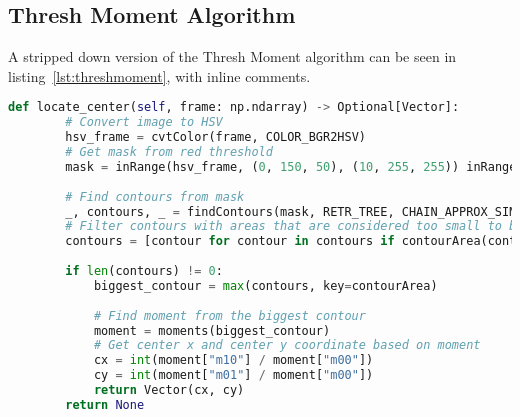\subsection{Thresh Moment Algorithm}\label{solution:thresh_moment}

A stripped down version of the Thresh Moment algorithm can be seen in listing~\ref{lst:threshmoment}, with inline comments.

\begin{lstlisting}[language=Python,label={lst:threshmoment},caption={Stripped version of thresh moment from thresh\_moment.py}]
	def locate_center(self, frame: np.ndarray) -> Optional[Vector]:
	    # Convert image to HSV
	    hsv_frame = cvtColor(frame, COLOR_BGR2HSV)
	    # Get mask from red threshold
	    mask = inRange(hsv_frame, (0, 150, 50), (10, 255, 255)) inRange(hsv_frame, (170, 150, 50), (180, 255, 255))
	    
	    # Find contours from mask
	    _, contours, _ = findContours(mask, RETR_TREE, CHAIN_APPROX_SIMPLE)
	    # Filter contours with areas that are considered too small to be the target
	    contours = [contour for contour in contours if contourArea(contour) > 20]
	    
	    if len(contours) != 0:
		    biggest_contour = max(contours, key=contourArea)
		    
		    # Find moment from the biggest contour
		    moment = moments(biggest_contour)
		    # Get center x and center y coordinate based on moment
		    cx = int(moment["m10"] / moment["m00"])
		    cy = int(moment["m01"] / moment["m00"])
		    return Vector(cx, cy)
	    return None
\end{lstlisting}